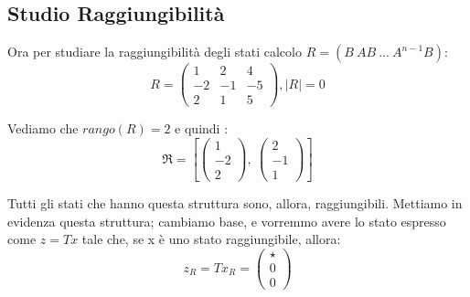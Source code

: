 \documentclass{article}
\begin{document}
\subsection{Studio Raggiungibilità}
Ora per studiare la raggiungibilità degli stati calcolo $R = (B\ AB\ ...\ A^{n-1}B)$: \[ R = \left(\begin{matrix}1 & 2 & 4\\-2 & -1 & -5\\2 & 1 & 5\end{matrix}\right), |R| = 0 \] 

Vediamo che $rango(R) = 2$ e quindi : \[ \mathfrak{R} = \left[ \left(\begin{matrix}1\\-2\\2\end{matrix}\right), \  \left(\begin{matrix}2\\-1\\1\end{matrix}\right)\right] \]

Tutti gli stati che hanno questa struttura sono, allora, raggiungibili. Mettiamo in evidenza questa struttura;
cambiamo base, e vorremmo avere lo stato espresso come $z = Tx$ tale che, se x è uno stato raggiungibile, allora: \[ z_R = T x_R = \begin{pmatrix} \star  \\ 0 \\0\end{pmatrix}\]
\end{document}
